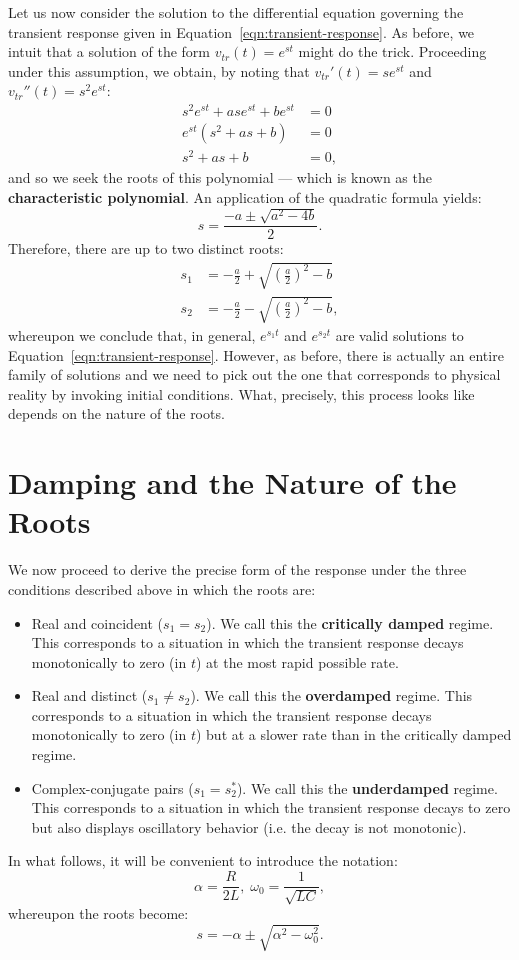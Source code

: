 \documentclass[twoside]{article}
\begin{document}
Let us now consider the solution to the differential equation governing the transient response given in Equation~\ref{eqn:transient-response}. As before, we intuit that a solution of the form $v_{tr}(t) = e^{st}$ might do the trick. Proceeding under this assumption, we obtain, by noting that $v_{tr}'(t) = se^{st}$ and $v_{tr}''(t) = s^{2}e^{st}$:
\begin{align*}
    s^{2}e^{st} + ase^{st} + be^{st} &= 0 \\
    e^{st}(s^{2} + as + b) &= 0 \\
    s^{2} + as + b &= 0,
\end{align*}
and so we seek the roots of this polynomial --- which is known as the \textbf{characteristic polynomial}. An application of the quadratic formula yields:
\[
    s = \frac{-a \pm \sqrt{a^{2} - 4b}}{2}.
\]
Therefore, there are up to two distinct roots:
\begin{align*}
    s_{1} &= -\frac{a}{2} + \sqrt{\left(\frac{a}{2}\right)^{2} - b} \\
    s_{2} &= -\frac{a}{2} - \sqrt{\left(\frac{a}{2}\right)^{2} - b},
\end{align*}
whereupon we conclude that, in general, $e^{s_{1}t}$ and $e^{s_{2}t}$ are valid solutions to Equation~\ref{eqn:transient-response}. However, as before, there is actually an entire family of solutions and we need to pick out the one that corresponds to physical reality by invoking initial conditions. What, precisely, this process looks like depends on the nature of the roots.

\section{Damping and the Nature of the Roots}

We now proceed to derive the precise form of the response under the three conditions described above in which the roots are:
\begin{itemize}
    \item[(1)] Real and coincident ($s_{1} = s_{2}$). We call this the \textbf{critically damped} regime. This corresponds to a situation in which the transient response decays monotonically to zero (in $t$) at the most rapid possible rate.
    \item[(2)] Real and distinct ($s_{1} \neq s_{2}$). We call this the \textbf{overdamped} regime. This corresponds to a situation in which the transient response decays monotonically to zero (in $t$) but at a slower rate than in the critically damped regime.
    \item[(3)] Complex-conjugate pairs ($s_{1} = s_{2}^{*}$). We call this the \textbf{underdamped} regime. This corresponds to a situation in which the transient response decays to zero but also displays oscillatory behavior (i.e. the decay is not monotonic).
\end{itemize}
In what follows, it will be convenient to introduce the notation:
\[
    \alpha = \frac{R}{2L}, \; \omega_{0} = \frac{1}{\sqrt{LC}},
\]
whereupon the roots become:
\[
    s = -\alpha \pm \sqrt{\alpha^{2} - \omega_{0}^{2}}.
\]
\end{document}
